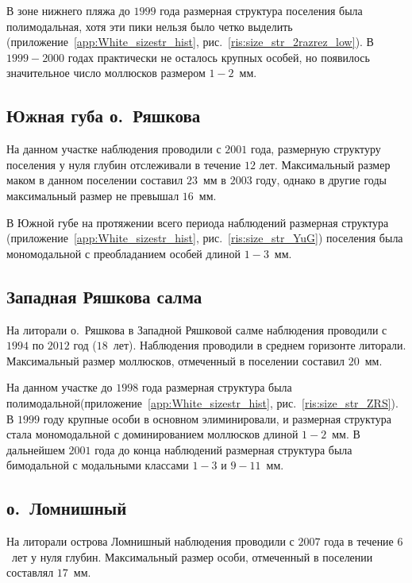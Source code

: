 В зоне нижнего пляжа до $1999$ года размерная структура поселения была полимодальная, хотя эти пики нельзя было четко выделить (приложение~\ref{app:White_sizestr_hist}, рис.~\ref{ris:size_str_2razrez_low}). 
В $1999-2000$ годах практически не осталось крупных особей, но появилось значительное число моллюсков размером $1-2$~мм. 

		\subsection*{Южная губа о.~Ряшкова}

На данном участке наблюдения проводили с $2001$ года, размерную структуру поселения у нуля глубин отслеживали в течение $12$ лет.
Максимальный размер маком в данном поселении составил $23$~мм в $2003$ году, однако в другие годы максимальный размер не превышал $16$~мм.

В Южной губе на протяжении всего периода наблюдений размерная структура (приложение~\ref{app:White_sizestr_hist}, рис.~\ref{ris:size_str_YuG}) поселения была мономодальной с преобладанием особей длиной $1-3$~мм. 



		\subsection*{Западная Ряшкова салма}

На литорали о.~Ряшкова в Западной Ряшковой салме наблюдения проводили с $1994$ по $2012$ год ($18$~лет). Наблюдения проводили в среднем горизонте литорали.
Максимальный размер моллюсков, отмеченный в поселении составил $20$~мм.

На данном участке  до $1998$ года размерная структура была полимодальной(приложение~\ref{app:White_sizestr_hist}, рис.~\ref{ris:size_str_ZRS}). 
В $1999$ году крупные особи в основном элиминировали, и размерная структура стала мономодальной с доминированием моллюсков длиной $1-2$~мм.
В дальнейшем $2001$ года до конца наблюдений размерная структура была бимодальной с модальными классами $1-3$ и $9-11$~мм.


		\subsection*{о.~Ломнишный}

На литорали острова Ломнишный наблюдения проводили с $2007$ года в течение $6$~лет у нуля глубин. 
Максимальный размер особи, отмеченный в поселении составлял $17$~мм.

